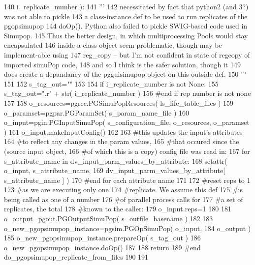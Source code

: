 \begin{DoxyCode}
140                                                 i\_replicate\_number ):
141     \textcolor{stringliteral}{'''}
142 \textcolor{stringliteral}{    necessitated by fact that python2 (and 3?) was not able to pickle }
143 \textcolor{stringliteral}{    a class-instance def to be used to run replicates of the pgopsimupop}
144 \textcolor{stringliteral}{    doOp().  Python also failed to pickle SWIG-based code used in Simupop.}
145 \textcolor{stringliteral}{    Thus the better design, in which  multiprocessing Pools would stay  encapsulated }
146 \textcolor{stringliteral}{    inside a class object seem problematic, though may be implement-able using }
147 \textcolor{stringliteral}{    reg\_copy -- but I'm not confident in state of regcopy of imported simuPop code,}
148 \textcolor{stringliteral}{    and so  I think is the safer solution, though it}
149 \textcolor{stringliteral}{    does create a depandancy of the pgguisimupop object on this outside def.  }
150 \textcolor{stringliteral}{    '''}
151 
152     s\_tag\_out=\textcolor{stringliteral}{""}
153 
154     \textcolor{keywordflow}{if} i\_replicate\_number \textcolor{keywordflow}{is} \textcolor{keywordflow}{not} \textcolor{keywordtype}{None}:
155         s\_tag\_out=\textcolor{stringliteral}{".r"} + str( i\_replicate\_number )
156     \textcolor{comment}{#end if rep number is not none}
157 
158     o\_resources=pgrec.PGSimuPopResources( ls\_life\_table\_files )
159     o\_paramset=pgpar.PGParamSet( s\_param\_name\_file )
160     o\_input=pgin.PGInputSimuPop( s\_configuration\_file, o\_resources, o\_paramset ) 
161     o\_input.makeInputConfig()
162 
163     \textcolor{comment}{#this updates the input's attributes}
164     \textcolor{comment}{#to reflect any changes in the param values,}
165     \textcolor{comment}{#that occured since the (source input object,}
166     \textcolor{comment}{#of which this is a copy) config file was read in:  }
167     \textcolor{keywordflow}{for} s\_attribute\_name \textcolor{keywordflow}{in} dv\_input\_parm\_values\_by\_attribute:
168         setattr( o\_input, s\_attribute\_name, 
169                 dv\_input\_parm\_values\_by\_attribute[ s\_attribute\_name ] )
170     \textcolor{comment}{#end for each attribute name}
171 
172     \textcolor{comment}{#reset reps to 1}
173     \textcolor{comment}{#as we are executing only one}
174     \textcolor{comment}{#replicate.  We assume this def}
175     \textcolor{comment}{#is being called as one of a number}
176     \textcolor{comment}{#of parallel process calls for}
177     \textcolor{comment}{#a set of replicates, the total }
178     \textcolor{comment}{#known to the caller:}
179     o\_input.reps=1
180 
181     o\_output=pgout.PGOutputSimuPop( s\_outfile\_basename )
182 
183     o\_new\_pgopsimupop\_instance=pgsim.PGOpSimuPop( o\_input,
184             o\_output )
185     o\_new\_pgopsimupop\_instance.prepareOp( s\_tag\_out  )
186     o\_new\_pgopsimupop\_instance.doOp()
187 
188     \textcolor{keywordflow}{return}
189 \textcolor{comment}{#end do\_pgopsimupop\_replicate\_from\_files}
190 
191 
\end{DoxyCode}
